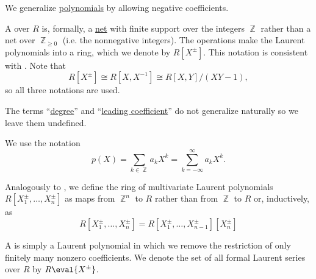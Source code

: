 \begin{definition}\label{def:laurent_polynomial}
  We generalize \hyperref[def:polynomial]{polynomials} by allowing negative coefficients.

  \begin{defenum}
     A  over \( R \) is, formally, a \hyperref[def:topological_net]{net} with finite support over the integers \( \BbbZ \) rather than a net over \( \BbbZ_{\geq 0} \) (i.e. the nonnegative integers). The operations  make the Laurent polynomials into a ring, which we denote by \( R[X^\pm] \). This notation is consistent with . Note that
    \begin{equation*}
      R[X^\pm] \cong R[X, X^{-1}] \cong R[X, Y] / (XY - 1),
    \end{equation*}
    so all three notations are used.

    The terms \enquote{\hyperref[def:polynomial/degree]{degree}} and \enquote{\hyperref[def:polynomial/leading_coefficient]{leading coefficient}} do not generalize naturally so we leave them undefined.

    We use the notation
    \begin{equation*}
      p(X) = \sum_{k \in \BbbZ} a_k X^k = \sum_{k=-\infty}^\infty a_k X^k.
    \end{equation*}

     Analogously to , we define the ring of multivariate Laurent polynomials \( R[X_1^\pm, \ldots, X_n^\pm] \) as maps from \( \BbbZ^n \) to \( R \) rather than from \( \BbbZ \) to \( R \) or, inductively, as
    \begin{equation*}
      R[X_1^\pm, \ldots, X_n^\pm] = R[X_1^\pm, \ldots, X_{n-1}^\pm][X_n^\pm]
    \end{equation*}

     A  is simply a Laurent polynomial in which we remove the restriction of only finitely many nonzero coefficients. We denote the set of all formal Laurent series over \( R \) by \( R\eval{X^\pm} \).
  \end{defenum}
\end{definition}
